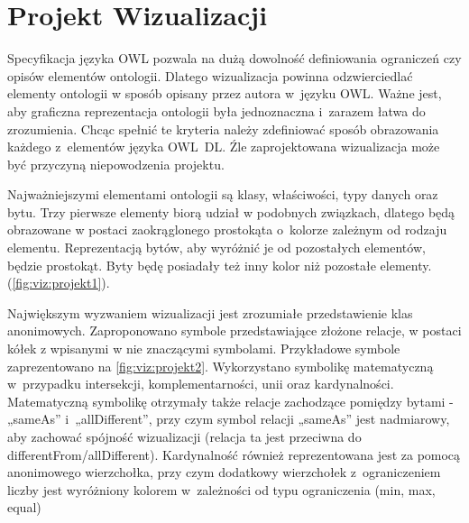 \section{Projekt Wizualizacji}

Specyfikacja języka OWL pozwala na dużą dowolność definiowania ograniczeń czy opisów elementów ontologii. Dlatego wizualizacja powinna 
odzwierciedlać elementy ontologii w sposób opisany przez autora w~języku OWL. Ważne jest, aby graficzna reprezentacja ontologii 
była jednoznaczna i~zarazem łatwa do zrozumienia. Chcąc spełnić te kryteria należy zdefiniować sposób obrazowania każdego z~elementów języka OWL~DL.
Źle zaprojektowana wizualizacja może być przyczyną niepowodzenia projektu. 
\par Najważniejszymi elementami ontologii są klasy, właściwości, typy danych oraz bytu. Trzy pierwsze elementy biorą udział w podobnych związkach, dlatego
 będą obrazowane w postaci zaokrąglonego prostokąta o~kolorze zależnym od rodzaju elementu. Reprezentacją bytów, aby wyróżnić je od pozostałych 
elementów, będzie prostokąt. Byty będę posiadały też inny kolor niż pozostałe elementy. (\figurename \space \ref{fig:viz:projekt1}).


\par
Największym wyzwaniem wizualizacji jest zrozumiałe przedstawienie klas anonimowych. Zaproponowano symbole przedstawiające złożone relacje, 
w postaci kółek z wpisanymi w nie znaczącymi symbolami. Przykładowe symbole zaprezentowano na \figurename \space \ref{fig:viz:projekt2}. Wykorzystano symbolikę matematyczną  
w~przypadku intersekcji, komplementarności, unii oraz kardynalności. Matematyczną symbolikę otrzymały także relacje zachodzące 
pomiędzy bytami  - „sameAs” i~„allDifferent”, przy czym symbol relacji „sameAs” jest  nadmiarowy, aby zachować spójność wizualizacji
 (relacja ta jest przeciwna do differentFrom/allDifferent). Kardynalność również reprezentowana jest za pomocą anonimowego wierzchołka, 
przy czym dodatkowy wierzchołek z~ograniczeniem liczby jest wyróżniony kolorem w~zależności od typu ograniczenia (min, max, equal)

\par


